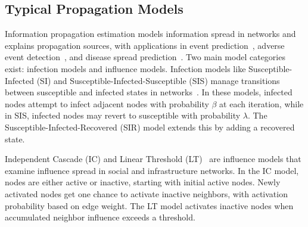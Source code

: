 \subsection{Typical Propagation Models}
Information propagation estimation models information spread in networks and explains propagation sources, with applications in event prediction~\citep{zhao2021event}, adverse event detection~\citep{wang2018multi}, and disease spread prediction~\citep{Tang2023Enhancing}. Two main model categories exist: infection models and influence models. Infection models like Susceptible-Infected (SI) and Susceptible-Infected-Susceptible (SIS) manage transitions between susceptible and infected states in networks~\citep{kermack1927contribution,keeling2005networks}. In these models, infected nodes attempt to infect adjacent nodes with probability $\beta$ at each iteration, while in SIS, infected nodes may revert to susceptible with probability $\lambda$. The Susceptible-Infected-Recovered (SIR) model extends this by adding a recovered state.

Independent Cascade (IC) and Linear Threshold (LT)~\citep{kempe2003maximizing} are influence models that examine influence spread in social and infrastructure networks. In the IC model, nodes are either active or inactive, starting with initial active nodes. Newly activated nodes get one chance to activate inactive neighbors, with activation probability based on edge weight. The LT model activates inactive nodes when accumulated neighbor influence exceeds a threshold.

